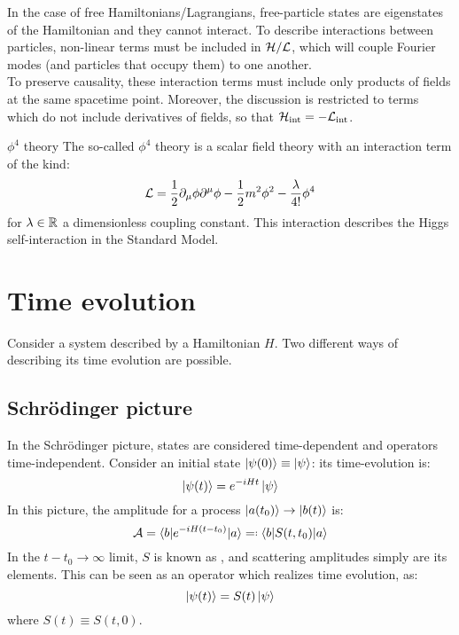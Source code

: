 
In the case of free Hamiltonians/Lagrangians, free-particle states are eigenstates of the Hamiltonian and they cannot interact. To describe interactions between particles, non-linear terms must be included in $ \mathcal{H} / \mathcal{L} $, which will couple Fourier modes (and particles that occupy them) to one another. \\
To preserve causality, these interaction terms must include only products of fields at the same spacetime point. Moreover, the discussion is restricted to terms which do not include derivatives of fields, so that $ \mathcal{H}_\text{int} = - \mathcal{L}_\text{int} $.

\begin{example}{$ \phi^4 $ theory}{}
  The so-called $ \phi^4 $ theory is a scalar field theory with an interaction term of the kind:
  \begin{equation}
    \mathcal{L} = \frac{1}{2} \partial_\mu \phi \partial^\mu \phi - \frac{1}{2} m^2 \phi^2 - \frac{\lambda}{4!} \phi^4
  \end{equation}
  for $ \lambda \in \mathbb{R} $ a dimensionless coupling constant. This interaction describes the Higgs self-interaction in the Standard Model.
\end{example}

\section{Time evolution}

Consider a system described by a Hamiltonian $ H $. Two different ways of describing its time evolution are possible.

\subsection{Schrödinger picture}

In the Schrödinger picture, states are considered time-dependent and operators time-independent. Consider an initial state $ \ket{\psi(0)} \equiv \ket{\psi} $: its time-evolution is:
\begin{equation}
  \ket{\psi(t)} = e^{-i H t} \ket{\psi}
\end{equation}
In this picture, the amplitude for a process $ \ket{a(t_0)} \rightarrow \ket{b(t)} $ is:
\begin{equation}
  \mathcal{A} = \braket{b | e^{-i H (t - t_0)} | a} \eqdef \braket{b | S(t,t_0) | a}
  \label{eq:schr-ampl}
\end{equation}
In the $ t - t_0 \rightarrow \infty $ limit, $ S $ is known as , and scattering amplitudes simply are its elements. This can be seen as an operator which realizes time evolution, as:
\begin{equation}
  \ket{\psi(t)} = S(t) \ket{\psi}
\end{equation}
where $ S(t) \equiv S(t,0) $.

